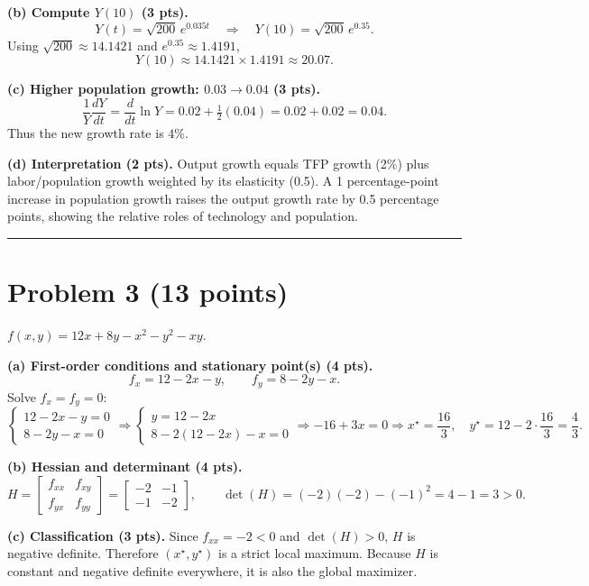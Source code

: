 \documentclass[12pt]{article}
\begin{document}
\textbf{(b) Compute \(Y(10)\) (3 pts).}
\[
Y(t)=\sqrt{200}\,e^{0.035 t}\quad\Rightarrow\quad Y(10)=\sqrt{200}\,e^{0.35}.
\]
Using \(\sqrt{200}\approx 14.1421\) and \(e^{0.35}\approx 1.4191\),
\[
Y(10)\approx 14.1421\times 1.4191 \approx 20.07.
\]

\textbf{(c) Higher population growth: \(0.03 \to 0.04\) (3 pts).}
\[
\frac{1}{Y}\frac{dY}{dt}=\frac{d}{dt}\ln Y = 0.02+\tfrac{1}{2}(0.04)=0.02+0.02=0.04.
\]
Thus the new growth rate is \(4\%\).

\textbf{(d) Interpretation (2 pts).}
Output growth equals TFP growth (2\%) plus labor/population growth weighted by its elasticity (0.5). A 1 percentage-point increase in population growth raises the output growth rate by 0.5 percentage points, showing the relative roles of technology and population.

\hrule
\vspace{8pt}

\section*{Problem 3 (13 points)}

\(f(x,y)=12x+8y-x^2-y^2-xy\).

\textbf{(a) First-order conditions and stationary point(s) (4 pts).}
\[
f_x=12-2x-y,\qquad f_y=8-2y-x.
\]
Solve \(f_x=f_y=0\):
\[
\begin{cases}
12-2x-y=0\\
8-2y-x=0
\end{cases}
\Rightarrow
\begin{cases}
y=12-2x\\
8-2(12-2x)-x=0
\end{cases}
\Rightarrow -16+3x=0 \Rightarrow x^\star=\dfrac{16}{3},\quad
y^\star=12-2\cdot\dfrac{16}{3}=\dfrac{4}{3}.
\]

\textbf{(b) Hessian and determinant (4 pts).}
\[
H=\begin{bmatrix}
f_{xx} & f_{xy}\\
f_{yx} & f_{yy}
\end{bmatrix}
=
\begin{bmatrix}
-2 & -1\\
-1 & -2
\end{bmatrix},\qquad \det(H)=(-2)(-2)-(-1)^2=4-1=3>0.
\]

\textbf{(c) Classification (3 pts).}
Since \(f_{xx}=-2<0\) and \(\det(H)>0\), \(H\) is negative definite. Therefore \((x^\star,y^\star)\) is a strict local maximum. Because \(H\) is constant and negative definite everywhere, it is also the global maximizer.
\end{document}
